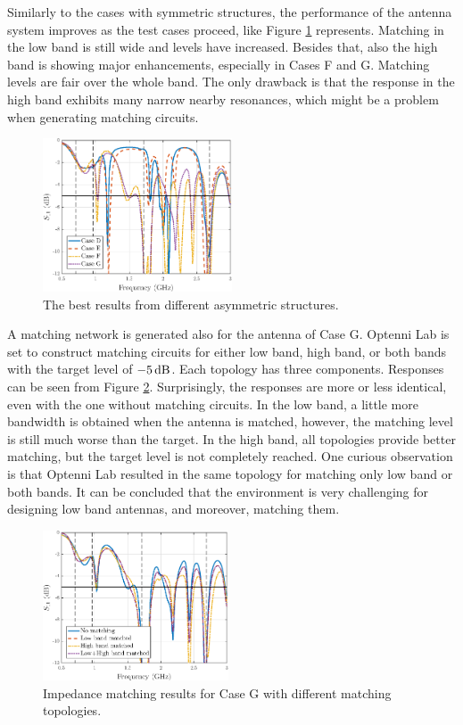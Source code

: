 Similarly to the cases with symmetric structures, the performance of the antenna system improves as the test cases proceed, like Figure \ref{fig:concept3} represents. Matching in the low band is still wide and levels have increased. Besides that, also the high band is showing major enhancements, especially in Cases F and G. Matching levels are fair over the whole band. The only drawback is that the response in the high band exhibits many narrow nearby resonances, which might be a problem when generating matching circuits.
\begin{figure}[H]
    \centering
    \includegraphics[width=0.5\textwidth]{img/concept3.eps}
    \caption{The best results from different asymmetric structures.}
    \label{fig:concept3}
    \vspace{-10pt}
\end{figure}

A matching network is generated also for the antenna of Case G. Optenni Lab is set to construct matching circuits for either low band, high band, or both bands with the target level of $-5\,\mathrm{dB}$. Each topology has three components. Responses can be seen from Figure \ref{fig:concept3_match}. Surprisingly, the responses are more or less identical, even with the one without matching circuits. In the low band, a little more bandwidth is obtained when the antenna is matched, however, the matching level is still much worse than the target. In the high band, all topologies provide better matching, but the target level is not completely reached. One curious observation is that Optenni Lab resulted in the same topology for matching only low band or both bands. It can be concluded that the environment is very challenging for designing low band antennas, and moreover, matching them.
\begin{figure}[H]
    \centering
    \vspace{-5pt}
    \includegraphics[width=0.49\textwidth]{img/concept3_match.eps}
    \caption{Impedance matching results for Case G with different matching topologies.}
    \label{fig:concept3_match}
    \vspace{-15pt}
\end{figure}

